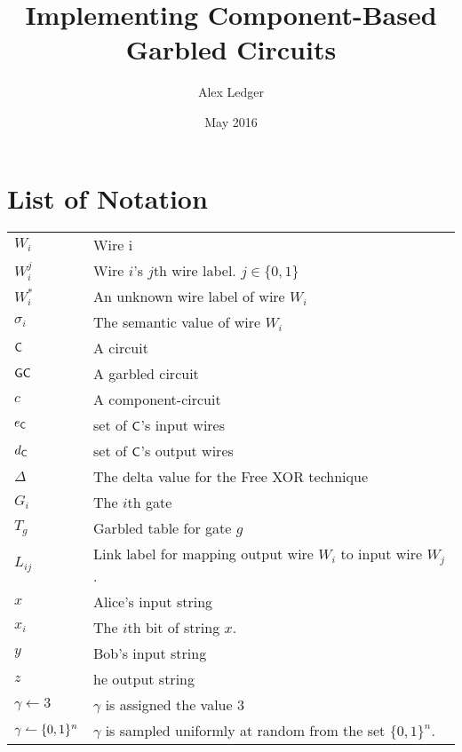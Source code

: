 \documentclass[12pt,twoside]{reedthesis}
\title{Implementing Component-Based Garbled Circuits}
\author{Alex Ledger}
\date{May 2016}
\begin{document}
\sloppy

\maketitle
\frontmatter %
\pagestyle{empty} %






\chapter*{List of Notation}

\begin{table}[h]
\centering %
\begin{tabular}{ll}
    $W_i$ & Wire i \\
    $W_i^j$ & Wire $i$'s $j$th wire label. $j \in \{0,1\}$ \\
    $W_i^*$ & An unknown wire label of wire $W_i$ \\
    $\sigma_i$ & The semantic value of wire $W_i$ \\
    $\sf {C}$ & A circuit \\
    $\sf {GC}$ & A garbled circuit \\
    $c$ & A component-circuit \\
    $e_{\sf {C}}$ & set of $\sf {C}$'s input wires \\
    $d_{\sf {C}}$ & set of $\sf {C}$'s output wires \\
    $\Delta$ & The delta value for the Free XOR technique \\
    $G_i$ & The $i$th gate \\
    $T_g$  & Garbled table for gate $g$ \\
    $L_{ij}$ & Link label for mapping output wire $W_i$ to input wire $W_j$. \\
    $x$ & Alice's input string \\
    $x_i$ & The $i$th bit of string $x$. \\
    $y$ & Bob's input string \\
    $z$ & he output string \\
    $\gamma \gets 3$ & $\gamma$ is assigned the value $3$ \\
    $\gamma \leftharpoonup \{0,1\}^n$ & $\gamma$ is sampled uniformly at random from the set $\{0,1\}^n$. \\
\end{tabular}
\end{table}
	
\end{document}
